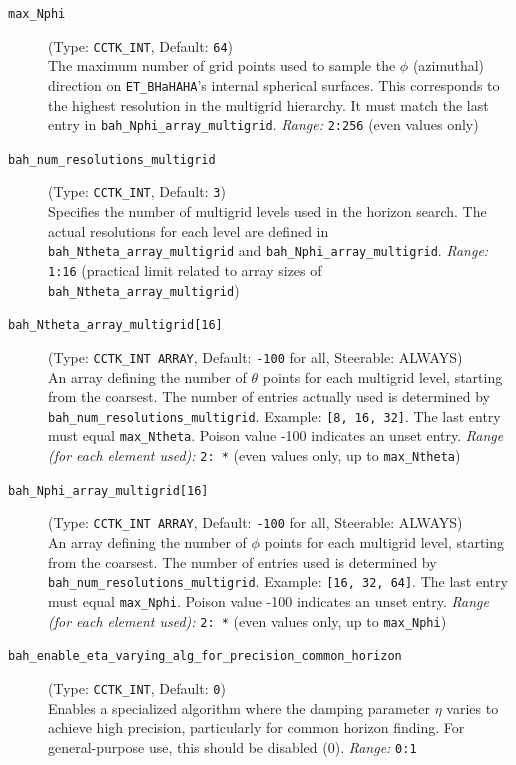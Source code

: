 \documentclass[a4paper,11pt]{article}
\newcommand{\thorn}[1]{{\tt #1}}
\newcommand{\BHaHAHA}{\thorn{ET\_BHaHAHA}} %
\begin{document}
\begin{description}
    \item[\texttt{max\_Nphi}] (Type: \texttt{CCTK\_INT}, Default: \texttt{64}) \\
        The maximum number of grid points used to sample the $\phi$ (azimuthal) direction on \BHaHAHA's internal spherical surfaces. This corresponds to the highest resolution in the multigrid hierarchy. It must match the last entry in \texttt{bah\_Nphi\_array\_multigrid}.
        \textit{Range:} \texttt{2:256} (even values only)

    \item[\texttt{bah\_num\_resolutions\_multigrid}] (Type: \texttt{CCTK\_INT}, Default: \texttt{3}) \\
        Specifies the number of multigrid levels used in the horizon search. The actual resolutions for each level are defined in \texttt{bah\_Ntheta\_array\_multigrid} and \texttt{bah\_Nphi\_array\_multigrid}.
        \textit{Range:} \texttt{1:16} (practical limit related to array sizes of \texttt{bah\_Ntheta\_array\_multigrid})

    \item[\texttt{bah\_Ntheta\_array\_multigrid[16]}] (Type: \texttt{CCTK\_INT ARRAY}, Default: \texttt{-100} for all, Steerable: ALWAYS) \\
        An array defining the number of $\theta$ points for each multigrid level, starting from the coarsest. The number of entries actually used is determined by \texttt{bah\_num\_resolutions\_multigrid}. Example: \texttt{[8, 16, 32]}. The last entry must equal \texttt{max\_Ntheta}. Poison value -100 indicates an unset entry.
        \textit{Range (for each element used):} \texttt{2: *} (even values only, up to \texttt{max\_Ntheta})

    \item[\texttt{bah\_Nphi\_array\_multigrid[16]}] (Type: \texttt{CCTK\_INT ARRAY}, Default: \texttt{-100} for all, Steerable: ALWAYS) \\
        An array defining the number of $\phi$ points for each multigrid level, starting from the coarsest. The number of entries used is determined by \texttt{bah\_num\_resolutions\_multigrid}. Example: \texttt{[16, 32, 64]}. The last entry must equal \texttt{max\_Nphi}. Poison value -100 indicates an unset entry.
        \textit{Range (for each element used):} \texttt{2: *} (even values only, up to \texttt{max\_Nphi})

    \item[\texttt{bah\_enable\_eta\_varying\_alg\_for\_precision\_common\_horizon}] (Type: \texttt{CCTK\_INT}, Default: \texttt{0}) \\
        Enables a specialized algorithm where the damping parameter $\eta$ varies to achieve high precision, particularly for common horizon finding. For general-purpose use, this should be disabled (0).
        \textit{Range:} \texttt{0:1}


\end{description}
\end{document}
